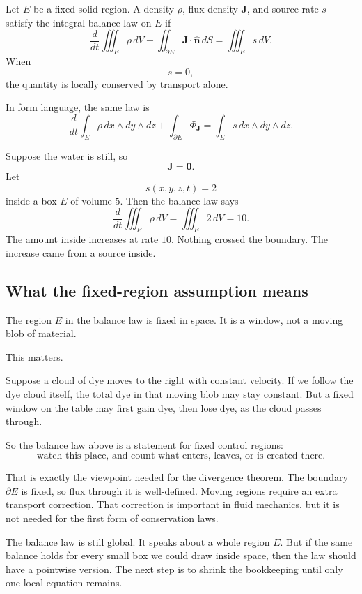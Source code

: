 \begin{definition}
Let \(E\) be a fixed solid region.  A density \(\rho\), flux density \(\mathbf J\), and
source rate \(s\) satisfy the integral balance law on \(E\) if
\[
\boxed{
    \frac{d}{dt}\iiint_E \rho\,dV
    +
    \iint_{\partial E}\mathbf J\cdot\widehat{\mathbf n}\,dS
    =
    \iiint_E s\,dV.
}
\]
When
\[
    s=0,
\]
the quantity is locally conserved by transport alone.
\end{definition}

In form language, the same law is
\[
\boxed{
    \frac{d}{dt}\int_E \rho\,dx\wedge dy\wedge dz
    +
    \int_{\partial E}\Phi_{\mathbf J}
    =
    \int_E s\,dx\wedge dy\wedge dz.
}
\]

\begin{example}
Suppose the water is still, so
\[
    \mathbf J=\mathbf 0.
\]
Let
\[
    s(x,y,z,t)=2
\]
inside a box \(E\) of volume \(5\).  Then the balance law says
\[
    \frac{d}{dt}\iiint_E \rho\,dV
    =
    \iiint_E 2\,dV
    =
    10.
\]
The amount inside increases at rate \(10\).  Nothing crossed the boundary.  The
increase came from a source inside.
\end{example}

\subsection{What the fixed-region assumption means}

The region \(E\) in the balance law is fixed in space.  It is a window, not a moving
blob of material.

This matters.

Suppose a cloud of dye moves to the right with constant velocity.  If we follow the dye
cloud itself, the total dye in that moving blob may stay constant.  But a fixed window
on the table may first gain dye, then lose dye, as the cloud passes through.

So the balance law above is a statement for fixed control regions:
\[
    \text{watch this place, and count what enters, leaves, or is created there.}
\]

That is exactly the viewpoint needed for the divergence theorem.  The boundary
\(\partial E\) is fixed, so flux through it is well-defined.  Moving regions require an
extra transport correction.  That correction is important in fluid mechanics, but it is
not needed for the first form of conservation laws.

The balance law is still global.  It speaks about a whole region \(E\).  But if the same
balance holds for every small box we could draw inside space, then the law should have
a pointwise version.  The next step is to shrink the bookkeeping until only one local
equation remains.

